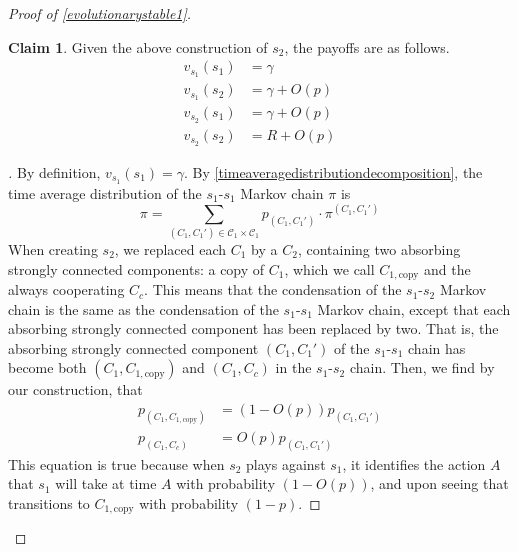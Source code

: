 \documentclass[11pt]{amsart}
\theoremstyle{definition}
\newtheorem{claim}[theorem]{Claim}
\theoremstyle{remark}
\newenvironment{subproof}[1][\proofname]{%
  \renewcommand{\qedsymbol}{$\blacksquare$}%
  \begin{proof}[#1]%
}{%
  \end{proof}%
}
\begin{document}
\begin{proof}[Proof of \cref{evolutionarystable1}]
      \begin{claim}
        \label{claimpayoffs}
        Given the above construction of $s_2$, the payoffs are as follows.
      \begin{align*}
        v_{s_1}(s_1) &= \gamma \\
        v_{s_1}(s_2) &= \gamma + O(p) \\
        v_{s_2}(s_1) &= \gamma + O(p) \\
        v_{s_2}(s_2) &= R + O(p)
      \end{align*}
      \end{claim}
      \begin{subproof}
        By definition, $v_{s_1}(s_1) = \gamma$. By \cref{timeaveragedistributiondecomposition}, the time average distribution of the $s_1$-$s_1$ Markov chain $\pi$ is \begin{equation*}
          \pi = \sum_{(C_1, C_1') \in \mathcal{C}_1 \times \mathcal{C}_1} p_{(C_1, C_1')} \cdot \pi^{(C_1, C_1')}
        \end{equation*}
        When creating $s_2$, we replaced each $C_1$ by a $C_2$, containing two absorbing strongly connected components: a copy of $C_1$, which we call $C_{1, \text{copy}}$ and the always cooperating $C_c$. This means that the condensation of the $s_1$-$s_2$ Markov chain is the same as the condensation of the $s_1$-$s_1$ Markov chain, except that each absorbing strongly connected component has been replaced by two. That is, the absorbing strongly connected component $(C_1, C_1')$ of the $s_1$-$s_1$ chain has become both $(C_1, C_{1, \text{copy}})$ and $(C_1, C_c)$ in the $s_1$-$s_2$ chain. Then, we find by our construction, that 
        \begin{align}
          \label{c1c1copy}
          p_{(C_1, C_{1, \text{copy}})} &= (1 - O(p)) p_{(C_1, C_1')} \\
          p_{(C_1, C_c)} &= O(p) p_{(C_1, C_1')}
        \end{align}
        This equation is true because when $s_2$ plays against $s_1$, it identifies the action $A$ that $s_1$ will take at time $A$ with probability $(1 - O(p))$, and upon seeing that transitions to $C_{1, \text{copy}}$ with probability $(1-p)$.


\end{subproof}
\end{proof}
\end{document}
